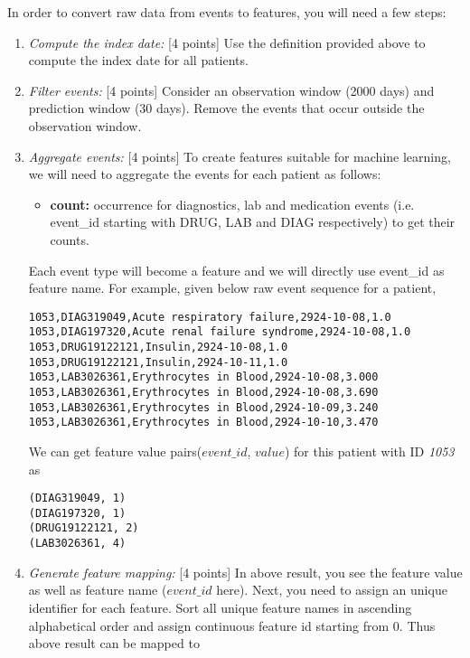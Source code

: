 \documentclass[12pt]{article}
\begin{document}
In order to convert raw data from events to features, you will need a few steps:
\begin{enumerate}
\item \emph{Compute the index date:} [4 points] Use the definition provided above to compute the index date for all patients. 

\item \emph{Filter events:} [4 points] Consider an observation window (2000 days) and prediction window (30 days).
Remove the events that occur outside the observation window. 

\item \emph{Aggregate events:} [4 points] To create features suitable for machine learning, we will need to aggregate the events for each patient as follows:
  \begin{itemize}
  \item \textbf{count:} occurrence for diagnostics, lab and medication events (i.e. event\_id starting with DRUG, LAB and DIAG respectively) to get their counts.  
  \end{itemize}
  
Each event type will become a feature and we will directly use event\_id as feature name. For example, given below raw event sequence for a patient, \\

\begin{lstlisting}[frame=single]
1053,DIAG319049,Acute respiratory failure,2924-10-08,1.0
1053,DIAG197320,Acute renal failure syndrome,2924-10-08,1.0
1053,DRUG19122121,Insulin,2924-10-08,1.0
1053,DRUG19122121,Insulin,2924-10-11,1.0
1053,LAB3026361,Erythrocytes in Blood,2924-10-08,3.000
1053,LAB3026361,Erythrocytes in Blood,2924-10-08,3.690
1053,LAB3026361,Erythrocytes in Blood,2924-10-09,3.240
1053,LAB3026361,Erythrocytes in Blood,2924-10-10,3.470
\end{lstlisting}

We can get feature value pairs($event\_id$, $value$) for this patient with ID \textit{1053} as \\
\begin{lstlisting}[frame=single]
(DIAG319049, 1)
(DIAG197320, 1)
(DRUG19122121, 2)
(LAB3026361, 4)
\end{lstlisting}


\item \emph{Generate feature mapping:} [4 points]
In above result, you see the feature value as well as feature name ($event\_id$ here). Next, you need to assign an unique identifier for each feature. Sort all unique feature names in ascending alphabetical order and assign continuous feature id starting from 0. Thus above result can be mapped to


\end{enumerate}
\end{document}
